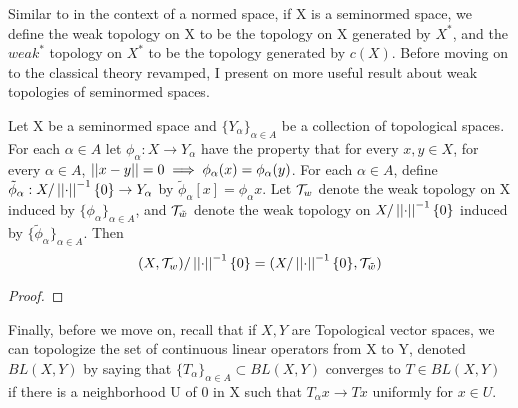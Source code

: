 








 Similar to in the context of a normed space, if X is a seminormed space, we define the weak topology on X to be the topology on X generated by $X^*$, and the $weak^*$ topology on $X^*$ to be the topology generated by $c(X)$.
Before moving on to the classical theory revamped, I present on more useful result about weak topologies of seminormed spaces. 
\begin{prop}
    \label{prop:weakquotients}
    Let X be a seminormed space and $\{Y_\alpha\}_{\alpha \in A}$ be a collection of topological spaces. For each $\alpha \in A$ let $\phi_\alpha:X \to Y_\alpha$ have the property that for every $x,y \in X$, for every $\alpha \in A$, $\left|\left| x-y \right|\right|=0 \implies \phi_\alpha(x)=\phi_\alpha(y)$. 
    For each $\alpha \in A$, define $\tilde{\phi}_\alpha:X/\left|\left| \cdot \right|\right|^{-1}\{0\} \to Y_\alpha$ by
    $\tilde{\phi}_{\alpha}[x] = \phi_\alpha x$. Let $\mathcal{T}_w$ denote the weak topology on X induced by $\{\phi_\alpha\}_{\alpha \in A}$, and $\mathcal{T}_{\tilde{w}}$ denote the weak topology on $X/\left|\left| \cdot \right|\right|^{-1}\{0\}$ induced by $\{\tilde{\phi}_{\alpha}\}_{\alpha \in A}$. Then 
    \begin{equation}
        (X,\mathcal{T}_w)/\left|\left| \cdot \right|\right|^{-1}\{0\} = (X/\left|\left| \cdot \right|\right|^{-1}\{0\}, \mathcal{T}_{\tilde{w}})
    \end{equation}
    \begin{proof}
    \end{proof} 
\end{prop} 


Finally, before we move on, recall that if $X,Y$ are Topological vector spaces, we can topologize the set of continuous linear operators from X to Y, denoted $BL(X,Y)$ by saying that $\{T_\alpha\}_{\alpha \in A} \subset BL(X,Y)$ converges to $T \in BL(X,Y)$ if there is a neighborhood U of 0 in X such that $T_{\alpha}x \to Tx$ uniformly for $x \in U$. 